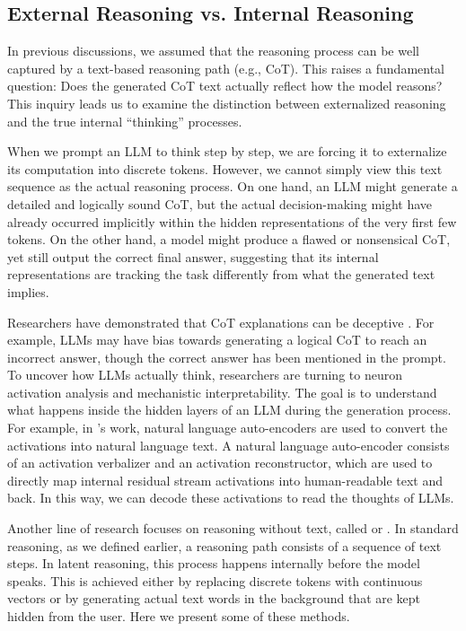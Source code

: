 \subsection{External Reasoning vs. Internal Reasoning}

In previous discussions, we assumed that the reasoning process can be well captured by a text-based reasoning path (e.g., CoT). This raises a fundamental question: Does the generated CoT text actually reflect how the model reasons? This inquiry leads us to examine the distinction between externalized reasoning and the true internal ``thinking'' processes.

When we prompt an LLM to think step by step, we are forcing it to externalize its computation into discrete tokens. However, we cannot simply view this text sequence as the actual reasoning process. On one hand, an LLM might generate a detailed and logically sound CoT, but the actual decision-making might have already occurred implicitly within the hidden representations of the very first few tokens. On the other hand, a model might produce a flawed or nonsensical CoT, yet still output the correct final answer, suggesting that its internal representations are tracking the task differently from what the generated text implies.

Researchers have demonstrated that CoT explanations can be deceptive \cite{turpin-etal:2023language,chen-etal:2025reasoning}. For example, LLMs may have bias towards generating a logical CoT to reach an incorrect answer, though the correct answer has been mentioned in the prompt. To uncover how LLMs actually think, researchers are turning to neuron activation analysis and mechanistic interpretability. The goal is to understand what happens inside the hidden layers of an LLM during the generation process. For example, in \citet{frasertaliente-etal:2026natural}'s work, natural language auto-encoders are used to convert the activations into natural language text. A natural language auto-encoder consists of an activation verbalizer and an activation reconstructor, which are used to directly map internal residual stream activations into human-readable text and back. In this way, we can decode these activations to read the thoughts of LLMs.

Another line of research focuses on reasoning without text, called  or . In standard reasoning, as we defined earlier, a reasoning path consists of a sequence of text steps. In latent reasoning, this process happens internally before the model speaks. This is achieved either by replacing discrete tokens with continuous vectors or by generating actual text words in the background that are kept hidden from the user. Here we present some of these methods.

